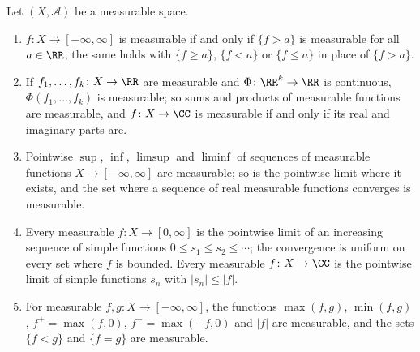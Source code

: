 \begin{proposition}\label{measure-theory:proposition-measurable-functions}
Let $(X, \mathcal{A})$ be a measurable space.
\begin{enumerate}
\item $f \colon X \to [-\infty, \infty]$ is measurable if and only if $\{f > a\}$ is measurable for all $a \in \RR$; the same holds with $\{f \geq a\}$, $\{f < a\}$ or $\{f \leq a\}$ in place of $\{f > a\}$.
\item If $f_1, \ldots, f_k \colon X \to \RR$ are measurable and $\Phi \colon \RR^k \to \RR$ is continuous, $\Phi(f_1, \ldots, f_k)$ is measurable; so sums and products of measurable functions are
measurable, and $f \colon X \to \CC$ is measurable if and only if its real and imaginary parts are.
\item Pointwise $\sup$, $\inf$, $\limsup$ and $\liminf$ of sequences of measurable functions $X \to [-\infty, \infty]$ are measurable; so is the pointwise limit where it exists, and the set where a
sequence of real measurable functions converges is measurable.
\item Every measurable $f \colon X \to [0, \infty]$ is the pointwise limit of an increasing sequence of simple functions $0 \leq s_1 \leq s_2 \leq \cdots$; the convergence is uniform on every set where $f$ is
bounded. Every measurable $f \colon X \to \CC$ is the pointwise limit of simple functions $s_n$ with $|s_n| \leq |f|$.
\item For measurable $f, g \colon X \to [-\infty, \infty]$, the functions $\max(f, g)$, $\min(f, g)$, $f^+ = \max(f, 0)$, $f^- = \max(-f, 0)$ and $|f|$ are measurable, and the sets $\{f < g\}$ and
$\{f = g\}$ are measurable.
\end{enumerate}
\end{proposition}

